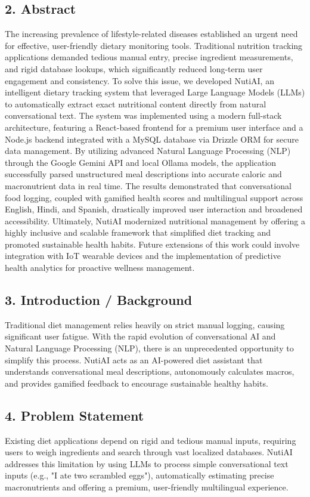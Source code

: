 \documentclass[12pt,a4paper]{report}
\begin{document}
\subsection*{2. Abstract}
The increasing prevalence of lifestyle-related diseases established an urgent need for effective, user-friendly dietary monitoring tools. Traditional nutrition tracking applications demanded tedious manual entry, precise ingredient measurements, and rigid database lookups, which significantly reduced long-term user engagement and consistency. To solve this issue, we developed NutiAI, an intelligent dietary tracking system that leveraged Large Language Models (LLMs) to automatically extract exact nutritional content directly from natural conversational text. The system was implemented using a modern full-stack architecture, featuring a React-based frontend for a premium user interface and a Node.js backend integrated with a MySQL database via Drizzle ORM for secure data management. By utilizing advanced Natural Language Processing (NLP) through the Google Gemini API and local Ollama models, the application successfully parsed unstructured meal descriptions into accurate caloric and macronutrient data in real time. The results demonstrated that conversational food logging, coupled with gamified health scores and multilingual support across English, Hindi, and Spanish, drastically improved user interaction and broadened accessibility. Ultimately, NutiAI modernized nutritional management by offering a highly inclusive and scalable framework that simplified diet tracking and promoted sustainable health habits. Future extensions of this work could involve integration with IoT wearable devices and the implementation of predictive health analytics for proactive wellness management.

\subsection*{3. Introduction / Background}
Traditional diet management relies heavily on strict manual logging, causing significant user fatigue. With the rapid evolution of conversational AI and Natural Language Processing (NLP), there is an unprecedented opportunity to simplify this process. NutiAI acts as an AI-powered diet assistant that understands conversational meal descriptions, autonomously calculates macros, and provides gamified feedback to encourage sustainable healthy habits.

\subsection*{4. Problem Statement}
Existing diet applications depend on rigid and tedious manual inputs, requiring users to weigh ingredients and search through vast localized databases. NutiAI addresses this limitation by using LLMs to process simple conversational text inputs (e.g., "I ate two scrambled eggs"), automatically estimating precise macronutrients and offering a premium, user-friendly multilingual experience.
\end{document}
